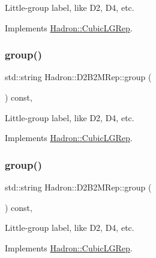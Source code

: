 Little-\/group label, like D2, D4, etc. 

Implements \mbox{\hyperlink{structHadron_1_1CubicLGRep_a9bdb14b519a611d21379ed96a3a9eb41}{Hadron\+::\+Cubic\+L\+G\+Rep}}.

\mbox{\label{structHadron_1_1D2B2MRep_a5eb48e359e6867273037597c30363ba7}} 
\subsubsection{\texorpdfstring{group()}{group()}\hspace{0.1cm}{\footnotesize\ttfamily [2/3]}}
{\footnotesize\ttfamily std\+::string Hadron\+::\+D2\+B2\+M\+Rep\+::group (\begin{DoxyParamCaption}{ }\end{DoxyParamCaption}) const\hspace{0.3cm}{\ttfamily [inline]}, {\ttfamily [virtual]}}

Little-\/group label, like D2, D4, etc. 

Implements \mbox{\hyperlink{structHadron_1_1CubicLGRep_a9bdb14b519a611d21379ed96a3a9eb41}{Hadron\+::\+Cubic\+L\+G\+Rep}}.

\mbox{\label{structHadron_1_1D2B2MRep_a5eb48e359e6867273037597c30363ba7}} 
\subsubsection{\texorpdfstring{group()}{group()}\hspace{0.1cm}{\footnotesize\ttfamily [3/3]}}
{\footnotesize\ttfamily std\+::string Hadron\+::\+D2\+B2\+M\+Rep\+::group (\begin{DoxyParamCaption}{ }\end{DoxyParamCaption}) const\hspace{0.3cm}{\ttfamily [inline]}, {\ttfamily [virtual]}}

Little-\/group label, like D2, D4, etc. 

Implements \mbox{\hyperlink{structHadron_1_1CubicLGRep_a9bdb14b519a611d21379ed96a3a9eb41}{Hadron\+::\+Cubic\+L\+G\+Rep}}.

\mbox{\label{structHadron_1_1D2B2MRep_a8559e189d9cd0f50fdf541f757661332}} 
